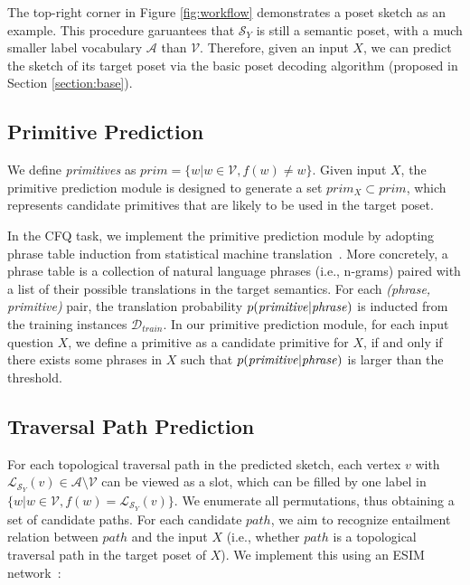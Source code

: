 \documentclass{article}
\begin{document}
The top-right corner in Figure \ref{fig:workflow} demonstrates a poset sketch as an example.
This procedure garuantees that $\mathcal{S}_Y$ is still a semantic poset, with a much smaller label vocabulary $\mathcal{A}$ than $\mathcal{V}$.
Therefore, given an input $X$, we can predict the sketch of its target poset via the basic poset decoding algorithm (proposed in Section \ref{section:base}).

\subsection{Primitive Prediction}
\label{sec:primitive_prediction}
We define \emph{primitives} as $prim = \{w|w\in\mathcal{V}, f(w)\neq w\}$.
Given input $X$, the primitive prediction module is designed to generate a set $prim_X\subset prim$, which represents candidate primitives that are likely to be used in the target poset.

In the CFQ task, we implement the primitive prediction module by adopting phrase table induction from statistical machine translation~\citep{koehn2009statistical}.
More concretely, a phrase table is a collection of natural language phrases (i.e., n-grams) paired with a list of their possible translations in the target semantics.
For each \emph{(phrase, primitive)} pair, the translation probability $p(\text{\emph{primitive}}|\text{\emph{phrase}})$ is inducted from the training instances $\mathcal{D}_{train}$.
In our primitive prediction module, for each input question $X$, we define a primitive as a candidate primitive for $X$, if and only if there exists some phrases in $X$ such that $p(\text{\emph{primitive}}|\text{\emph{phrase}})$ is larger than the threshold.

\subsection{Traversal Path Prediction}

For each topological traversal path in the predicted sketch, each vertex $v$ with $\mathcal{L}_{\mathcal{S}_Y}(v)\in \mathcal{A}\setminus\mathcal{V}$ can be viewed as a slot, which can be filled by one label in $\{w|w\in\mathcal{V}, f(w)=\mathcal{L}_{\mathcal{S}_Y}(v)\}$.
We enumerate all permutations, thus obtaining a set of candidate paths.
For each candidate $path$, we aim to recognize entailment relation between $path$ and the input $X$ (i.e., whether $path$ is a topological traversal path in the target poset of $X$).
We implement this using an ESIM network~\citep{chen2016enhanced}:
\end{document}
